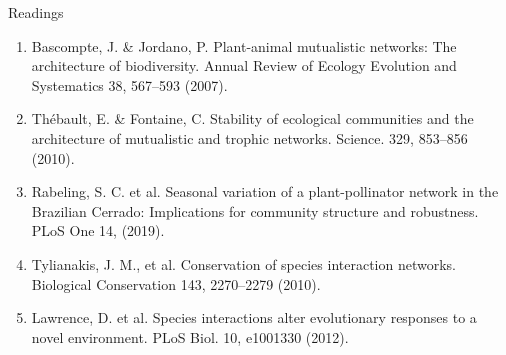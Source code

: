   
\begin{frame}{Readings}

\begin{enumerate}\setlength{\itemindent}{-2em}\itemsep4pt

  \item Bascompte, J. \& Jordano, P. Plant-animal mutualistic networks: The architecture of biodiversity. Annual Review of Ecology Evolution and Systematics 38, 567--593 (2007).
  
 
  \item Th\'{e}bault, E. \& Fontaine, C. Stability of ecological communities and the architecture of mutualistic and trophic networks. Science. 329, 853--856 (2010).
 
  \item Rabeling, S. C. et al. Seasonal variation of a plant-pollinator network in the Brazilian Cerrado: Implications for community structure and robustness. PLoS One 14, (2019).
  
  \item  Tylianakis, J. M.,  et al. Conservation of species interaction networks. Biological Conservation 143, 2270--2279 (2010).
  
  \item Lawrence, D. et al. Species interactions alter evolutionary responses to a novel environment. PLoS Biol. 10, e1001330 (2012).

\end{enumerate}
  
\end{frame}


